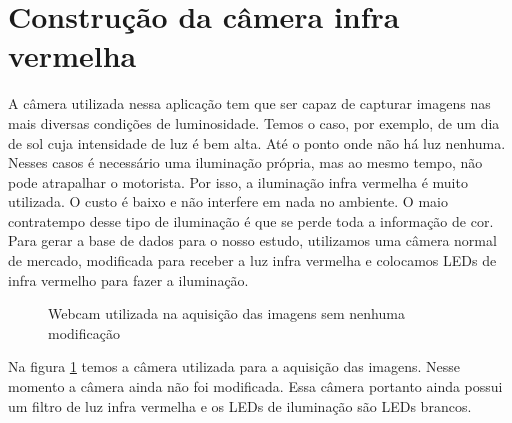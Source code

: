 \section{Construção da câmera infra vermelha}

A câmera utilizada nessa aplicação tem que ser capaz de capturar imagens nas mais diversas condições de luminosidade. Temos o caso, por exemplo, de um dia de sol cuja intensidade de luz é bem alta. Até o ponto onde não há luz nenhuma.
Nesses casos é necessário uma iluminação própria, mas ao mesmo tempo, não pode atrapalhar o motorista. Por isso, a iluminação infra vermelha é muito utilizada. O custo é baixo e não interfere em nada no ambiente. O maio contratempo desse tipo de iluminação é que se perde toda a informação de cor.
Para gerar a base de dados para o nosso estudo, utilizamos uma câmera normal de mercado, modificada para receber a luz infra vermelha e colocamos LEDs de infra vermelho para fazer a iluminação.


\begin{figure}[ht!]
\centering
{}
  \caption{Webcam utilizada na aquisição das imagens sem nenhuma modificação}
  \label{fig:camera_01}
\end{figure}

Na figura \ref{fig:camera_01} temos a câmera utilizada para a aquisição das imagens. Nesse momento a câmera ainda não foi modificada. Essa câmera portanto ainda possui um filtro de luz infra vermelha e os LEDs de iluminação são LEDs brancos.

